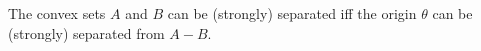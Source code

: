The convex sets $A$ and $B$ can be (strongly) separated iff the origin $\theta$ can be (strongly) separated from $A - B$.
